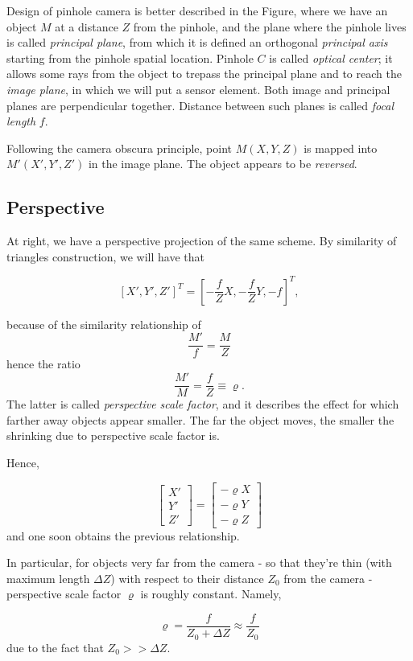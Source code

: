 \documentclass[10pt]{report}
\begin{document}
Design of pinhole camera is better described in the Figure, where we
have an object \(M\) at a distance \(Z\) from the pinhole, and the plane
where the pinhole lives is called \emph{principal plane}, from which it is
defined an orthogonal \emph{principal axis} starting from the pinhole spatial
location. Pinhole \(C\) is called \emph{optical center}; it allows some rays
from the object to trepass the principal plane and to reach the \emph{image
plane}, in which we will put a sensor element. Both image and principal
planes are perpendicular together. Distance between such planes is
called \emph{focal length} \(f\).

Following the camera obscura principle, point \(M(X,Y,Z)\) is mapped
into \(M'(X',Y',Z')\) in the image plane. The object appears to be
\emph{reversed}.

\subsection{Perspective}
\label{perspective}
At right, we have a perspective projection of the same scheme. By
similarity of triangles construction, we will have that

\[ [X', Y', Z']^T =  [-\frac{f}{Z}X, -\frac{f}{Z}Y, -f]^T,\]

because of the similarity relationship of \[\frac{M'}{f} = \frac{M}{Z}\]
hence the ratio \[\frac{M'}{M} = \frac{f}{Z} \equiv \varrho.\] The latter is
called \emph{perspective scale factor}, and it describes the effect for which
farther away objects appear smaller. The far the object moves, the
smaller the shrinking due to perspective scale factor is.

Hence,

$$ \begin{bmatrix}X' \\ Y' \\ Z'\end{bmatrix} = \begin{bmatrix} -\varrho X \\ -\varrho Y \\ -\varrho Z\end{bmatrix}$$ and one soon obtains the previous relationship.

In particular, for objects very far from the camera - so that they're
thin (with maximum length \(\Delta Z\)) with respect to their distance
\(Z_0\) from the camera - perspective scale factor \(\varrho\) is roughly constant.
Namely,

\[ \varrho = \frac{f}{Z_0 + \Delta Z} \approx \frac{f}{Z_0} \] due to the
fact that \(Z_0 >> \Delta Z\).
\end{document}
